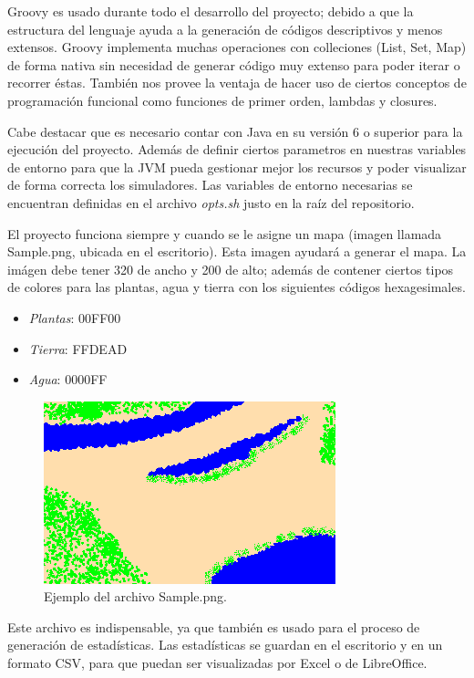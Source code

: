     Groovy es usado durante todo el desarrollo del proyecto; debido a que la estructura del lenguaje ayuda a la generación de códigos descriptivos y menos extensos. Groovy implementa muchas operaciones con colleciones (List, Set, Map) de forma nativa sin necesidad de generar código muy extenso para poder iterar o recorrer éstas. También nos provee la ventaja de hacer uso de ciertos conceptos de programación funcional como funciones de primer orden, lambdas y closures.

    Cabe destacar que es necesario contar con Java en su versión 6 o superior para la ejecución del proyecto. Además de definir ciertos parametros en nuestras variables de entorno para que la JVM pueda gestionar mejor los recursos y poder visualizar de forma correcta los simuladores. Las variables de entorno necesarias se encuentran definidas en el archivo \textit{opts.sh} justo en la raíz del repositorio.

    El proyecto funciona siempre y cuando se le asigne un mapa (imagen llamada Sample.png, ubicada en el escritorio). Esta imagen ayudará a generar el mapa. La imágen debe tener 320 de ancho y 200 de alto; además de contener ciertos tipos de colores para las plantas, agua y tierra con los siguientes códigos hexagesimales.
      \begin{itemize}
        \item{\textit{Plantas}: 00FF00}
        \item{\textit{Tierra}: FFDEAD}
        \item{\textit{Agua}: 0000FF}
      \end{itemize}
      \begin{figure}[h!]
        \centering
          \includegraphics[width=\textwidth]{./images/Sample.png}
          \caption{Ejemplo del archivo Sample.png.} 
      \end{figure}
    Este archivo es indispensable, ya que también es usado para el proceso de generación de estadísticas. Las estadísticas se guardan en el escritorio y en un formato CSV, para que puedan ser visualizadas por Excel o de LibreOffice.
\newpage
